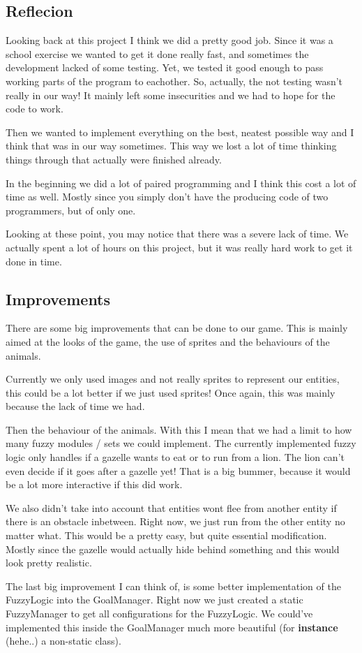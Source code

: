 \subsection[Reflection on the end result]{Reflecion}\label{subsec:reflection}
Looking back at this project I think we did a pretty good job.
Since it was a school exercise we wanted to get it done really fast, and sometimes the development lacked of some testing.
Yet, we tested it good enough to pass working parts of the program to eachother.
So, actually, the not testing wasn't really in our way!
It mainly left some insecurities and we had to hope for the code to work.

Then we wanted to implement everything on the best, neatest possible way and I think that was in our way sometimes.
This way we lost a lot of time thinking things through that actually were finished already.

In the beginning we did a lot of paired programming and I think this cost a lot of time as well.
Mostly since you simply don't have the producing code of two programmers, but of only one.

Looking at these point, you may notice that there was a severe lack of time.
We actually spent a lot of hours on this project, but it was really hard work to get it done in time.

\subsection[Improvements of our project]{Improvements}\label{subsec:improvements}
There are some big improvements that can be done to our game.
This is mainly aimed at the looks of the game, the use of sprites and the behaviours of the animals.

Currently we only used images and not really sprites to represent our entities, this could be a lot better if we just used sprites!
Once again, this was mainly because the lack of time we had.

Then the behaviour of the animals.
With this I mean that we had a limit to how many fuzzy modules / sets we could implement.
The currently implemented fuzzy logic only handles if a gazelle wants to eat or to run from a lion.
The lion can't even decide if it goes after a gazelle yet!
That is a big bummer, because it would be a lot more interactive if this did work.

We also didn't take into account that entities wont flee from another entity if there is an obstacle inbetween.
Right now, we just run from the other entity no matter what.
This would be a pretty easy, but quite essential modification.
Mostly since the gazelle would actually hide behind something and this would look pretty realistic.

The last big improvement I can think of, is some better implementation of the FuzzyLogic into the GoalManager.
Right now we just created a static FuzzyManager to get all configurations for the FuzzyLogic.
We could've implemented this inside the GoalManager much more beautiful (for \textbf{instance} (hehe..) a non-static class).

